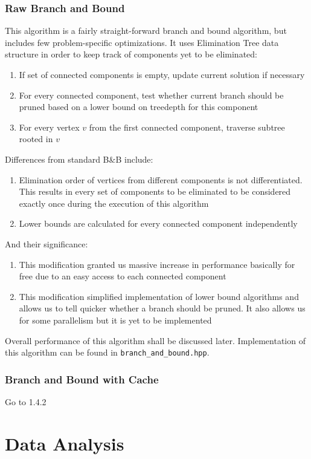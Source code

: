 \documentclass[a4paper]{article}
\begin{document}
	\subsubsection{Raw Branch and Bound}
	This algorithm is a fairly straight-forward branch and bound algorithm, but includes few problem-specific optimizations. It uses Elimination Tree data structure in order to keep track of components yet to be eliminated:
	\begin{enumerate}
		\item If set of connected components is empty, update current solution if necessary
		\item For every connected component, test whether current branch should be pruned based on a lower bound on treedepth for this component
		\item For every vertex $v$ from the first connected component, traverse subtree rooted in $v$
	\end{enumerate}
	Differences from standard B\&B include:
	\begin{enumerate}
		\item Elimination order of vertices from different components is not differentiated. This results in every set of components to be eliminated to be considered exactly once during the execution of this algorithm
		\item Lower bounds are calculated for every connected component independently
	\end{enumerate}
	And their significance:
	\begin{enumerate}
		\item This modification granted us massive increase in performance basically for free due to an easy access to each connected component
		\item This modification simplified implementation of lower bound algorithms and allows us to tell quicker whether a branch should be pruned. It also allows us for some parallelism but it is yet to be implemented
	\end{enumerate}
	Overall performance of this algorithm shall be discussed later. Implementation of this algorithm can be found in \texttt{branch\_and\_bound.hpp}.
	\subsubsection{Branch and Bound with Cache}
	Go to 1.4.2
	\newpage
	\section{Data Analysis}
\end{document}

